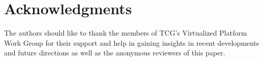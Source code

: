 \section*{Acknowledgments} 
The authors should like to thank the members of TCG's Virtualized Platform Work Group for their support and help in gaining insights in recent developments and future directions as well as the anonymous reviewers of this paper.
